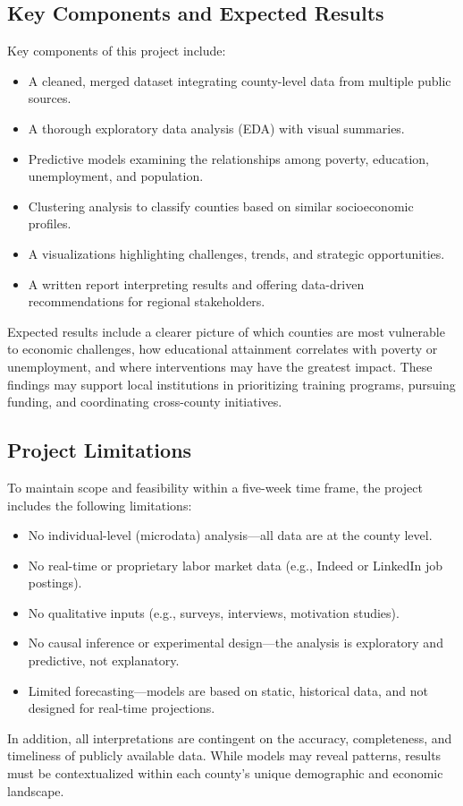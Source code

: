 \documentclass{llncs}
\begin{document}
\subsection{Key Components and Expected Results}
Key components of this project include:
\begin{itemize}
    \item A cleaned, merged dataset integrating county-level data from multiple public sources.
    \item A thorough exploratory data analysis (EDA) with visual summaries.
    \item Predictive models examining the relationships among poverty, education, unemployment, and population.
    \item Clustering analysis to classify counties based on similar socioeconomic profiles.
    \item A visualizations highlighting challenges, trends, and strategic opportunities.
    \item A written report interpreting results and offering data-driven recommendations for regional stakeholders.
\end{itemize}
Expected results include a clearer picture of which counties are most vulnerable to economic challenges, how educational attainment correlates with poverty or unemployment, and where interventions may have the greatest impact. These findings may support local institutions in prioritizing training programs, pursuing funding, and coordinating cross-county initiatives.
\subsection{Project Limitations}
To maintain scope and feasibility within a five-week time frame, the project includes the following limitations:
\begin{itemize}
    \item No individual-level (microdata) analysis—all data are at the county level.
    \item No real-time or proprietary labor market data (e.g., Indeed or LinkedIn job postings).
    \item No qualitative inputs (e.g., surveys, interviews, motivation studies).
    \item No causal inference or experimental design—the analysis is exploratory and predictive, not explanatory.
    \item Limited forecasting—models are based on static, historical data, and not designed for real-time projections.
\end{itemize}
In addition, all interpretations are contingent on the accuracy, completeness, and timeliness of publicly available data. While models may reveal patterns, results must be contextualized within each county’s unique demographic and economic landscape.
\end{document}
